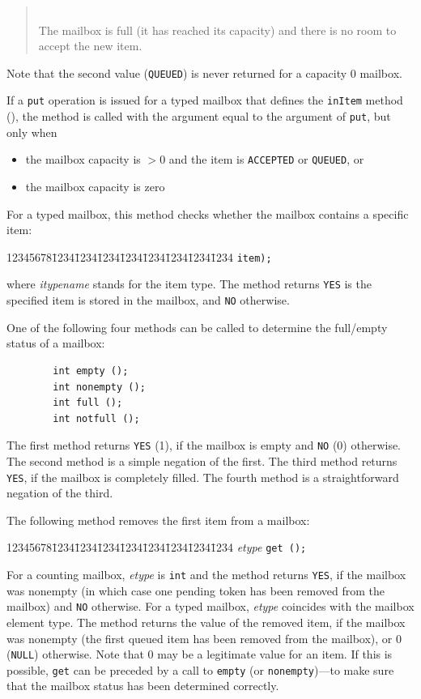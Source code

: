 \begin{quote}
\noindent{}\\ \hspace{0in}
The mailbox is full (it has reached its capacity)
and there is no room to accept the new item.
\end{quote}\medskip

Note that the second value ({\tt QUEUED}) is never returned for a
capacity 0 mailbox.

If a {\tt put} operation is issued for a typed mailbox that defines the
{\tt inItem} method (), the method is called
with the argument equal to the argument of {\tt put}, but only when
\begin{itemize}
\item
the mailbox capacity is $> 0$ and
the item is {\tt ACCEPTED} or {\tt QUEUED}, or
\item
the mailbox capacity is zero
\end{itemize}

For a typed mailbox, this method checks whether the mailbox contains a specific
item:
{\tt\begin{tabbing}
12345678\=1234\=1234\=1234\=1234\=1234\=1234\=1234\=1234\kill
{} {\tt item);}
\end{tabbing}}
\noindent
where {\em itypename\/} stands for the item type.
The method returns {\tt YES} is the specified item is stored in the mailbox,
and {\tt NO} otherwise.

One of the following four methods can be called to determine the full/empty
status of a mailbox:
\begin{verbatim}
        int empty ();
        int nonempty ();
        int full ();
        int notfull ();
\end{verbatim}
The first method returns {\tt YES} (1), if the mailbox is empty and {\tt NO}
(0) otherwise.
The second method is a simple negation of the first.
The third method returns {\tt YES}, if the mailbox is completely filled.
The fourth method is a straightforward negation of the third.

The following method removes the first item from a mailbox:
{\tt\begin{tabbing}
12345678\=1234\=1234\=1234\=1234\=1234\=1234\=1234\=1234\kill
\> {\em etype\/} {\tt get (); }
\end{tabbing}}
For a counting mailbox, {\em etype\/} is {\tt int}
and the method returns {\tt YES}, if the mailbox was
nonempty (in which case one pending token has been removed from the mailbox)
and {\tt NO} otherwise.
For a typed mailbox, {\em etype} coincides with the mailbox element type.
The method returns the value of the
removed item, if the mailbox was
nonempty (the first queued item has been removed from the mailbox), or
0 ({\tt NULL}) otherwise.
Note that 0 may be a legitimate value for an item.
If this is possible,
{\tt get} can be preceded
by a call to {\tt empty} (or {\tt nonempty})---to make sure that the mailbox
status has been determined correctly.


